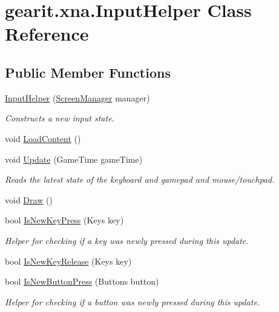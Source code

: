 \hypertarget{classgearit_1_1xna_1_1_input_helper}{\section{gearit.\+xna.\+Input\+Helper Class Reference}
\label{classgearit_1_1xna_1_1_input_helper}
}
\subsection*{Public Member Functions}
\begin{DoxyCompactItemize}
\item 
\hyperlink{classgearit_1_1xna_1_1_input_helper_a4e43b40bb32a610c4a7cc16a09fcba74}{Input\+Helper} (\hyperlink{classgearit_1_1xna_1_1_screen_manager}{Screen\+Manager} manager)
\begin{DoxyCompactList}\small\item\em Constructs a new input state. \end{DoxyCompactList}\item 
void \hyperlink{classgearit_1_1xna_1_1_input_helper_a07e245d72cc0a94dd6093933d4afe183}{Load\+Content} ()
\item 
void \hyperlink{classgearit_1_1xna_1_1_input_helper_ab804b0907d4030d4b93d0aea4b2ee505}{Update} (Game\+Time game\+Time)
\begin{DoxyCompactList}\small\item\em Reads the latest state of the keyboard and gamepad and mouse/touchpad. \end{DoxyCompactList}\item 
void \hyperlink{classgearit_1_1xna_1_1_input_helper_a8ce079405645fb602c4d5373fd9595d5}{Draw} ()
\item 
bool \hyperlink{classgearit_1_1xna_1_1_input_helper_a9d0c2ce93a81b564bf9914863da68b46}{Is\+New\+Key\+Press} (Keys key)
\begin{DoxyCompactList}\small\item\em Helper for checking if a key was newly pressed during this update. \end{DoxyCompactList}\item 
bool \hyperlink{classgearit_1_1xna_1_1_input_helper_a6ec3dddd48d7b56c7997d0e09f9c6e54}{Is\+New\+Key\+Release} (Keys key)
\item 
bool \hyperlink{classgearit_1_1xna_1_1_input_helper_ab1885059ab34f4adfe29811a5e20d534}{Is\+New\+Button\+Press} (Buttons button)
\begin{DoxyCompactList}\small\item\em Helper for checking if a button was newly pressed during this update. \end{DoxyCompactList}\item 

\end{DoxyCompactItemize}
